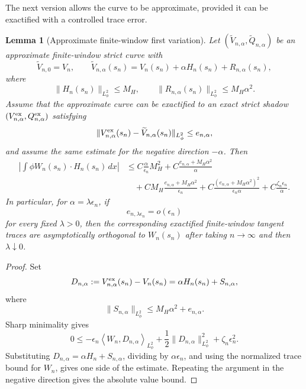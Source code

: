 \documentclass[11pt]{article}
\numberwithin{equation}{section}
\theoremstyle{plain}
\newtheorem{lemma}{Lemma}[section]
\theoremstyle{definition}
\theoremstyle{remark}
\newcommand{\ip}[2]{\left\langle #1,#2\right\rangle}
\begin{document}
The next version allows the curve to be approximate, provided it can be exactified with a
controlled trace error.

\begin{lemma}[Approximate finite-window first variation]
\label{pV:lem:approx-finite-window-first-variation}
Let \((\widetilde V_{n,\alpha},\widetilde Q_{n,\alpha})\) be an approximate finite-window strict
curve with
\[
        \widetilde V_{n,0}=V_n,
        \qquad
        \widetilde V_{n,\alpha}(s_n)
        =V_n(s_n)+\alpha H_n(s_n)+R_{n,\alpha}(s_n),
\]
where
\[
        \|H_n(s_n)\|_{L^2_\phi}\le M_H,
        \qquad
        \|R_{n,\alpha}(s_n)\|_{L^2_\phi}\le M_H\alpha^2.
\]
Assume that the approximate curve can be exactified to an exact strict shadow
\((V^{\rm ex}_{n,\alpha},Q^{\rm ex}_{n,\alpha})\) satisfying
\[
        \|V^{\rm ex}_{n,\alpha}(s_n)-\widetilde V_{n,\alpha}(s_n)\|_{L^2_\phi}
        \le e_{n,\alpha},
\]
and assume the same estimate for the negative direction \(-\alpha\).  Then
\[
\begin{aligned}
        \left|\int \phi W_n(s_n)\cdot H_n(s_n)\,dx\right|
        &\le
        C\frac{\alpha}{\epsilon_n}M_H^2
        +C\frac{e_{n,\alpha}+M_H\alpha^2}{\alpha}  \\
        &\quad
        +CM_H\frac{e_{n,\alpha}+M_H\alpha^2}{\epsilon_n}
        +C\frac{(e_{n,\alpha}+M_H\alpha^2)^2}{\epsilon_n\alpha}
        +C\frac{\zeta_n\epsilon_n}{\alpha}.
\end{aligned}
\]
In particular, for \(\alpha=\lambda\epsilon_n\), if
\[
        e_{n,\lambda\epsilon_n}=o(\epsilon_n)
\]
for every fixed \(\lambda>0\), then the corresponding exactified finite-window tangent traces
are asymptotically orthogonal to \(W_n(s_n)\) after taking \(n\to\infty\) and then
\(\lambda\downarrow0\).
\end{lemma}

\begin{proof}
Set
\[
        D_{n,\alpha}:=V^{\rm ex}_{n,\alpha}(s_n)-V_n(s_n)
        =\alpha H_n(s_n)+S_{n,\alpha},
\]
where
\[
        \|S_{n,\alpha}\|_{L^2_\phi}\le M_H\alpha^2+e_{n,\alpha}.
\]
Sharp minimality gives
\[
        0\le
        -\epsilon_n\ip{W_n}{D_{n,\alpha}}_{L^2_\phi}
        +\frac12\|D_{n,\alpha}\|_{L^2_\phi}^2
        +\zeta_n\epsilon_n^2.
\]
Substituting \(D_{n,\alpha}=\alpha H_n+S_{n,\alpha}\), dividing by
\(\alpha\epsilon_n\), and using the normalized trace bound for \(W_n\), gives one side of
the estimate.  Repeating the argument in the negative direction gives the absolute value bound.
\end{proof}
\end{document}
